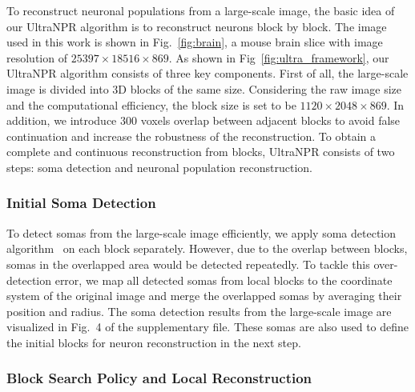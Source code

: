 {To reconstruct neuronal populations from a large-scale image, the basic idea of our UltraNPR algorithm is to reconstruct neurons block by block.
The image used in this work is shown in Fig.~\ref{fig:brain}, a mouse brain slice with image resolution of $25397\times 18516\times 869$.
%
As shown in Fig~\ref{fig:ultra_framework}, our UltraNPR algorithm consists of three key components.
%
First of all, the large-scale image is divided into 3D blocks of the same size. 
Considering the raw image size and the computational efficiency, the block size is set to be $1120\times 2048\times 869$. 
In addition, we introduce $300$ voxels overlap between adjacent blocks to avoid false continuation and increase the robustness of the reconstruction.
To obtain a complete and continuous reconstruction from blocks, UltraNPR consists of two steps: soma detection and neuronal population reconstruction.

\subsubsection{Initial Soma Detection}
\label{sec:soma}

To detect somas from the large-scale image efficiently, we apply soma detection algorithm~\cite{Quan2013} on each block separately.
However, due to the overlap between blocks, somas in the overlapped area would be detected repeatedly.
To tackle this over-detection error, we map all detected somas from local blocks to the coordinate system of the original image and merge the overlapped somas by averaging their position and radius.
The soma detection results from the large-scale image are visualized in Fig.~{4} of the supplementary file.
These somas are also used to define the initial blocks for neuron reconstruction in the next step.


\subsubsection{Block Search Policy and Local Reconstruction}
\label{sec:trace}

}
